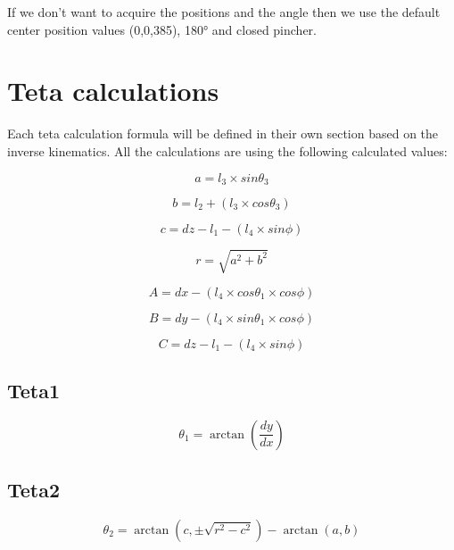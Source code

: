 			\hspace{15pt}If we don't want to acquire the positions and the angle then we use the default center position values (0,0,385), 180° and closed pincher.

	\section{Teta calculations}\label{calculations}
	
		\hspace{15pt}Each teta calculation formula will be defined in their own section based on the inverse kinematics. All the calculations are using the following calculated values:
		
		\hspace{15pt}\[ a = l_3\times sin\theta_3 \]
		
		\hspace{15pt}\[ b = l_2 + (l_3\times cos\theta_3) \]
		
		\hspace{15pt}\[ c = dz - l_1 - (l_4\times sin\phi) \]
		
		\hspace{15pt}\[ r = \sqrt{a^2+b^2} \]
		
		\hspace{15pt}\[ A = dx - (l_4\times cos\theta_1 \times cos\phi) \]
		
		\hspace{15pt}\[ B = dy - (l_4\times sin\theta_1 \times cos\phi) \]
		
		\hspace{15pt}\[ C = dz - l_1 - (l_4\times sin\phi)\]
		
		\subsection{Teta1}
		
			\hspace{15pt}\[ \theta_1 = \arctan(\frac{dy}{dx}) \]
		
			
	
		\subsection{Teta2}
		
			\hspace{15pt}\[ \theta_2 = \arctan(c, \pm\sqrt{r^2-c^2}) - \arctan(a,b) \]
		
